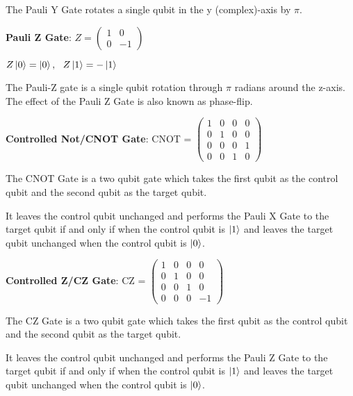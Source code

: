 \documentclass{article}
\begin{document}
\noindent
The Pauli Y Gate rotates a single qubit in the y (complex)-axis by $\pi$.
\pagebreak


\textbf{Pauli Z Gate}: \qquad $Z = \begin{pmatrix} 1 & 0 \\ 0 & -1 \end{pmatrix}$
\vspace{5mm}


\qquad $Z\ket{0} = \ket{0} , \ \ Z\ket{1} = -\ket{1}$
\vspace{5mm}

\noindent
The Pauli-Z gate is a single qubit rotation through $\pi$ radians around the z-axis. The effect of the Pauli Z Gate is also known as phase-flip.
\vspace{5mm}

\textbf{Controlled Not/CNOT Gate}: \qquad CNOT = $\begin{pmatrix} 1 & 0 & 0 & 0 \\ 0 & 1 & 0 & 0 \\ 0 & 0 & 0 & 1 \\ 0 & 0 & 1 & 0 \end{pmatrix}$
\vspace{5mm}

\noindent
The CNOT Gate is a two qubit gate which takes the first qubit as the control qubit and the second qubit as the target qubit.
\vspace{5mm}

\noindent
It leaves the control qubit unchanged and performs the Pauli X Gate to the target qubit if and only if when the control qubit is $\ket{1}$ and leaves the target qubit unchanged when the control qubit is $\ket{0}$.
\vspace{5mm}

\textbf{Controlled Z/CZ Gate}: \qquad CZ = $\begin{pmatrix} 1 & 0 & 0 & 0 \\ 0 & 1 & 0 & 0 \\ 0 & 0 & 1 & 0 \\ 0 & 0 & 0 & -1 \end{pmatrix}$
\vspace{5mm}

\noindent
The CZ Gate is a two qubit gate which takes the first qubit as the control qubit and the second qubit as the target qubit.
\vspace{5mm}

\noindent
It leaves the control qubit unchanged and performs the Pauli Z Gate to the target qubit if and only if when the control qubit is $\ket{1}$ and leaves the target qubit unchanged when the control qubit is $\ket{0}$.
\vspace{5mm}
\end{document}
